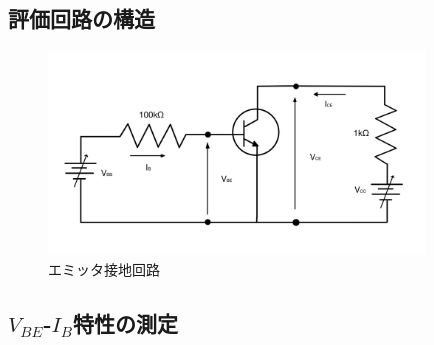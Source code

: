 \documentclass[titlepage]{jarticle}
\begin{document}
\subsection{評価回路の構造}
\begin{figure}[H]
    \begin{center}
        \includegraphics[width=10cm]{image/emitter.jpg}
        \caption{エミッタ接地回路}
        \label{fig:エミッタ接地回路}
    \end{center}
\end{figure}

\subsection{$V_{BE}$-$I_B$特性の測定}
\end{document}
